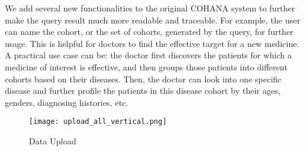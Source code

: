We add several new functionalities to the original COHANA system to further make the query result much more readable and traceable.
For example, the user can name the cohort, or the set of cohorts, generated by the query, for further usage.
This is helpful for doctors to find the effective target for a new medicine. 
A practical use case can be: the doctor first discovers the patients for which a medicine of interest is effective,
and then groups those patients into different cohorts based on their diseases. Then, the doctor can look into one specific disease and further profile the patients in this disease cohort by their ages, genders, diagnosing histories, etc.




\begin{figure}
    \centering
    \texttt{[image: upload\_all\_vertical.png]}
    \vspace{-1em}
    \caption{Data Upload}
    \label{fig:upload}
    \vspace{-2em}
\end{figure}

